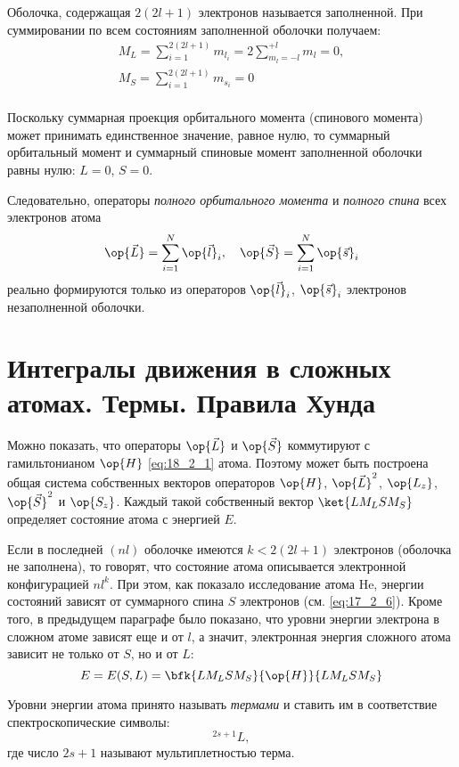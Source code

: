 Оболочка, содержащая $2(2l + 1)$ электронов называется заполненной. При суммировании по всем состояниям заполненной оболочки получаем:
\begin{gather*}
M_L = \sum_{i = 1}^{2(2l+1)} m_{l_i} = 2 \sum_{m_l=-l}^{+l} m_l = 0, \\ 
M_S = \sum_{i = 1}^{2(2l+1)} m_{s_i} = 0\\
\end{gather*}

Поскольку суммарная проекция орбитального момента (спинового момента) может принимать единственное значение, равное нулю, то суммарный орбитальный момент и суммарный спиновые момент заполненной оболочки равны нулю: $L=0$, $S=0$.

Следовательно, операторы {\em полного орбитального момента} и {\em полного спина} всех электронов атома
\begin{equation}
\label{eq:18_2_4}
\op{\vec{L}} = \sum_{i = 1}^{N} \op{\vec{l}}_i,~~~\op{\vec{S}} = \sum_{i = 1}^{N} \op{\vec{s}}_i
\end{equation}
реально формируются только из операторов $\op{\vec{l}}_i$, $\op{\vec{s}}_i$ электронов незаполненной оболочки.

\section{Интегралы движения в сложных атомах. Термы. Правила Хунда}

Можно показать, что операторы $\op{\vec{L}}$ и $\op{\vec{S}}$ коммутируют с гамильтонианом $\op{H}$ \eqref{eq:18_2_1} атома. Поэтому может быть построена общая система собственных векторов операторов  $\op{H}$, $\op{\vec{L}}^2$, $\op{L_z}$, $\op{\vec{S}}^2$ и $\op{S_z}$. Каждый такой собственный вектор $\ket{L M_L S M_S}$ определяет состояние атома с энергией $E$.

Если в последней $(nl)$ оболочке имеются $k < 2(2l+1)$ электронов (оболочка не заполнена), то говорят, что состояние атома описывается электронной конфигурацией $nl^k$. При этом, как показало исследование атома He, энергии состояний зависят от суммарного спина $S$ электронов (см. \eqref{eq:17_2_6}). Кроме того, в предыдущем параграфе было показано, что уровни энергии электрона в сложном атоме зависят еще и от $l$, а значит, электронная энергия сложного атома зависит не только от $S$, но и от $L$:
$$
E = E(S, L) = \bfk{L M_L S M_S}{\op{H}}{L M_L S M_S}
$$ 

Уровни энергии атома принято называть {\em термами} и ставить им в соответствие спектроскопические символы:
$$\boxed{^{2s+1}L},$$
где число $2s+1$ называют мультиплетностью терма.


